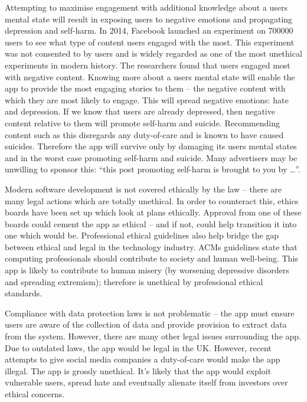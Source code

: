 \documentclass[10pt,\jkfside,a4paper]{article}
\begin{document}
Attempting to maximise engagement with additional knowledge about a users
mental state will result in exposing users to negative emotions and
propagating depression and self-harm. In 2014, Facebook launched an
experiment on 700000 users to see what type of content users engaged with
the most. This experiment was not consented to by users and is widely
regarded as one of the most unethical experiments in modern history. The
researchers found that users engaged most with negative content. Knowing
more about a users mental state will enable the app to provide the most
engaging stories to them -- the negative content with which they are most
likely to engage. This will spread negative emotions: hate and depression.
If we know that users are already depressed, then negative content relative
to them will promote self-harm and suicide. Recommending content such as
this disregards any duty-of-care and is known to have caused suicides.
Therefore the app will survive only by damaging its users mental states and
in the worst case promoting self-harm and suicide. Many advertisers may be
unwilling to sponsor this: ``this post promoting self-harm is brought to you
by \ldots''.

Modern software development is not covered ethically by the law -- there
are many legal actions which are totally unethical. In order to counteract
this, ethics boards have been set up which look at plans ethically. Approval
from one of these boards could cement the app as ethical -- and if not,
could help transition it into one which would be. Professional ethical
guidelines also help bridge the gap between ethical and legal in the
technology industry. ACMs guidelines state that computing professionals
should contribute to society and human well-being. This app is likely to
contribute to human misery (by worsening depressive disorders and spreading
extremism); therefore is unethical by professional ethical standards.

Compliance with data protection laws is not problematic -- the app must
ensure users are aware of the collection of data and provide provision to
extract data from the system. However, there are many other legal issues
surrounding the app. Due to outdated laws, the app would be legal in the
UK\@. However, recent attempts to give social media companies a
duty-of-care would make the app illegal. The app is grossly unethical. It's
likely that the app would exploit vulnerable users, spread hate and
eventually alienate itself from investors over ethical concerns.
\end{document}
